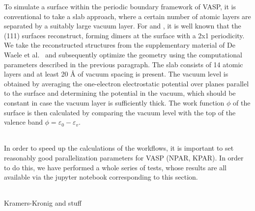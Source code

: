 \begin{refsection}
To simulate a surface within the periodic boundary framework of VASP, it is conventional to take a slab approach, where a certain number of atomic layers are separated by a suitably large vacuum layer. For  and , it is well known that the (111) surfaces reconstruct, forming dimers at the surface with a 2x1 periodicity. We take the reconstructed structures from the supplementary material of De Waele et al.~\cite{DeWaele2016} and subsequently optimize the geometry using the computational parameters described in the previous paragraph. The slab consists of 14 atomic layers and at least 20 \si{\angstrom} of vacuum spacing is present. The vacuum level is obtained by averaging the one-electron electrostatic potential over planes parallel to the surface and determining the potential in the vacuum, which should be constant in case the vacuum layer is sufficiently thick. The work function $\phi$ of the surface is then calculated by comparing the vacuum level with the top of the valence band $\phi = \varepsilon_0 - \varepsilon_v$.


\label{appendix:sec-parallel}\\
In order to speed up the calculations of the workflows, it is important to set reasonably good parallelization parameters for VASP (NPAR, KPAR). In order to do this, we have performed a whole series of tests, whose results are all available via the jupyter notebook corresponding to this section.


\label{appendix:sec-cshift}\\
Kramers-Kronig and stuff

\printbibliography
\end{refsection}